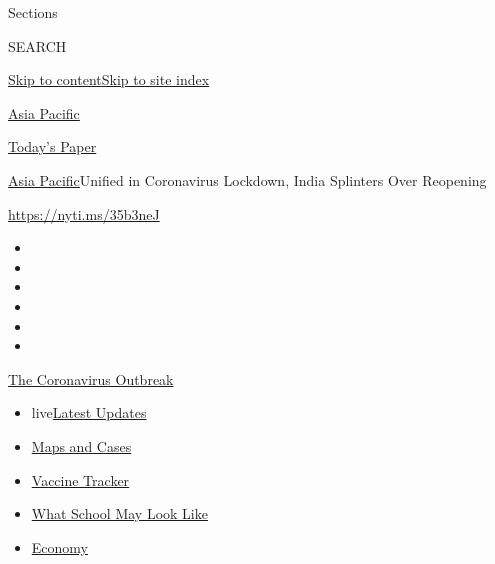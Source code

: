 Sections

SEARCH

\protect\hyperlink{site-content}{Skip to
content}\protect\hyperlink{site-index}{Skip to site index}

\href{https://www.nytimes.com/section/world/asia}{Asia Pacific}

\href{https://myaccount.nytimes.com/auth/login?response_type=cookie\&client_id=vi}{}

\href{https://www.nytimes.com/section/todayspaper}{Today's Paper}

\href{/section/world/asia}{Asia Pacific}\textbar{}Unified in Coronavirus
Lockdown, India Splinters Over Reopening

\url{https://nyti.ms/35b3neJ}

\begin{itemize}
\item
\item
\item
\item
\item
\item
\end{itemize}

\href{https://www.nytimes.com/news-event/coronavirus?action=click\&pgtype=Article\&state=default\&region=TOP_BANNER\&context=storylines_menu}{The
Coronavirus Outbreak}

\begin{itemize}
\tightlist
\item
  live\href{https://www.nytimes.com/2020/08/02/world/coronavirus-updates.html?action=click\&pgtype=Article\&state=default\&region=TOP_BANNER\&context=storylines_menu}{Latest
  Updates}
\item
  \href{https://www.nytimes.com/interactive/2020/us/coronavirus-us-cases.html?action=click\&pgtype=Article\&state=default\&region=TOP_BANNER\&context=storylines_menu}{Maps
  and Cases}
\item
  \href{https://www.nytimes.com/interactive/2020/science/coronavirus-vaccine-tracker.html?action=click\&pgtype=Article\&state=default\&region=TOP_BANNER\&context=storylines_menu}{Vaccine
  Tracker}
\item
  \href{https://www.nytimes.com/interactive/2020/07/29/us/schools-reopening-coronavirus.html?action=click\&pgtype=Article\&state=default\&region=TOP_BANNER\&context=storylines_menu}{What
  School May Look Like}
\item
  \href{https://www.nytimes.com/live/2020/07/31/business/stock-market-today-coronavirus?action=click\&pgtype=Article\&state=default\&region=TOP_BANNER\&context=storylines_menu}{Economy}
\end{itemize}

